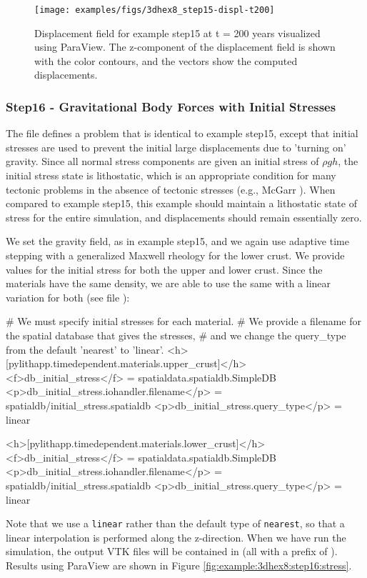 \begin{figure}
  \texttt{[image: examples/figs/3dhex8\_step15-displ-t200]}
  \caption{Displacement field for example step15 at t = 200 years visualized
    using ParaView. The z-component of the displacement field is shown
    with the color contours, and the vectors show the computed displacements.}
  \label{fig:example:3dhex8:step15:displacement}
\end{figure}


\subsubsection{Step16 - Gravitational Body Forces with Initial Stresses}

The  file defines a problem that is identical to
example step15, except that initial stresses are used to prevent the
initial large displacements due to 'turning on' gravity. Since all
normal stress components are given an initial stress of $\rho gh$,
the initial stress state is lithostatic, which is an appropriate condition
for many tectonic problems in the absence of tectonic stresses (e.g.,
McGarr \cite{McGarr:1988}). When compared to example step15, this
example should maintain a lithostatic state of stress for the entire
simulation, and displacements should remain essentially zero.

We set the gravity field, as in example step15, and we again use adaptive
time stepping with a generalized Maxwell rheology for the lower crust.
We provide values for the initial stress for both the upper and lower
crust. Since the materials have the same density, we are able to use
the same  with a linear variation for both (see file
):
\begin{cfg}
# We must specify initial stresses for each material.
# We provide a filename for the spatial database that gives the stresses,
# and we change the query_type from the default 'nearest' to 'linear'.
<h>[pylithapp.timedependent.materials.upper_crust]</h>
<f>db_initial_stress</f> = spatialdata.spatialdb.SimpleDB
<p>db_initial_stress.iohandler.filename</p> = spatialdb/initial_stress.spatialdb
<p>db_initial_stress.query_type</p> = linear

<h>[pylithapp.timedependent.materials.lower_crust]</h>
<f>db_initial_stress</f> = spatialdata.spatialdb.SimpleDB
<p>db_initial_stress.iohandler.filename</p> = spatialdb/initial_stress.spatialdb
<p>db_initial_stress.query_type</p> = linear
\end{cfg}
Note that we use a \texttt{linear}  rather than
the default type of \texttt{nearest}, so that a linear interpolation
is performed along the z-direction. When we have run the simulation,
the output VTK files will be contained in 
(all with a prefix of ). Results using ParaView are
shown in Figure \vref{fig:example:3dhex8:step16:stress}.

